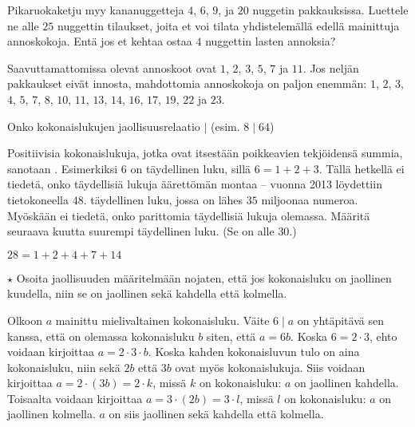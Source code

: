 \begin{tehtavasivu}
\begin{tehtava}
Pikaruokaketju myy kananuggetteja $4$, $6$, $9$, ja $20$ nuggetin pakkauksissa. Luettele ne alle $25$ nuggettin tilaukset, joita et voi tilata yhdistelemällä edellä mainittuja annoskokoja. Entä jos et kehtaa ostaa $4$ nuggettin lasten annoksia?
	\begin{vastaus}
		Saavuttamattomissa olevat annoskoot ovat $1$, $2$, $3$, $5$, $7$ ja $11$. Jos neljän pakkaukset eivät innosta, mahdottomia annoskokoja on paljon enemmän: $1$, $2$, $3$, $4$, $5$, $7$, $8$, $10$, $11$, $13$, $14$, $16$, $17$, $19$, $22$ ja $23$.
	\end{vastaus}
\end{tehtava}

\begin{tehtava}
Onko kokonaislukujen jaollisuusrelaatio $\mid$ (esim. $8\mid 64$)
	\begin{vastaus}
	\end{vastaus}
\end{tehtava}

\begin{tehtava}
Positiivisia kokonaislukuja, jotka ovat itsestään poikkeavien tekjöidensä summia, sanotaan . Esimerkiksi $6$ on täydellinen luku, sillä $6=1+2+3$. Tällä hetkellä ei tiedetä, onko täydellisiä lukuja äärettömän montaa -- vuonna 2013 löydettiin tietokoneella $48.$ täydellinen luku, jossa on lähes $35$ miljoonaa numeroa. Myöskään ei tiedetä, onko parittomia täydellisiä lukuja olemassa.
Määritä seuraava kuutta suurempi täydellinen luku. (Se on alle $30$.)
	\begin{vastaus}
$28=1+2+4+7+14$
	\end{vastaus}
\end{tehtava}

\begin{tehtava} %
$\star$ Osoita jaollisuuden määritelmään nojaten, että jos kokonaisluku on jaollinen kuudella, niin se on jaollinen sekä kahdella että kolmella.
	\begin{vastaus}
	Olkoon $a$ mainittu mielivaltainen kokonaisluku. Väite $6\mid a$ on yhtäpitävä sen kanssa, että on olemassa kokonaisluku $b$ siten, että $a=6b$. Koska $6=2\cdot3$, ehto voidaan kirjoittaa $a=2\cdot3\cdot b$. Koska kahden kokonaisluvun tulo on aina kokonaisluku, niin sekä $2b$ että $3b$ ovat myös kokonaislukuja. Siis voidaan kirjoittaa $a=2\cdot (3b)=2\cdot k$, missä $k$ on kokonaisluku: $a$ on jaollinen kahdella. Toisaalta voidaan kirjoittaa $a=3\cdot (2b)=3\cdot l$, missä $l$ on kokonaisluku: $a$ on jaollinen kolmella. $a$ on siis jaollinen sekä kahdella että kolmella. 
	\end{vastaus}
\end{tehtava}

\end{tehtavasivu}